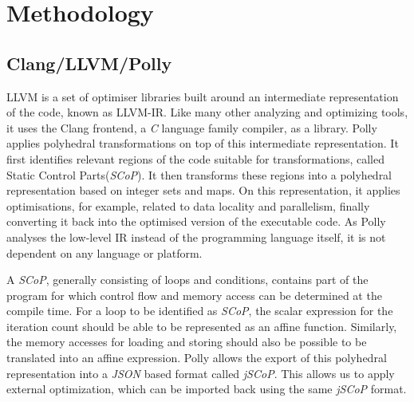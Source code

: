 \documentclass[logo,msc]{infthesis}           %
\begin{document}
\chapter{Methodology}

\section{Clang/LLVM/Polly}

LLVM is a set of optimiser libraries built around an intermediate representation of the code, known as LLVM-IR. Like many other analyzing and optimizing tools, it uses the Clang frontend, a \textit{C} language family compiler, as a library.
Polly applies polyhedral transformations on top of this intermediate representation. It first identifies relevant regions of the code suitable for transformations, called Static Control Parts(\textit{SCoP}). It then transforms these regions into a polyhedral representation based on integer sets and maps. On this representation, it applies optimisations, for example, related to data locality and parallelism, finally converting it back into the optimised version of the executable code. As Polly analyses the low-level IR instead of the programming language itself, it is not dependent on any language or platform.

A \textit{SCoP}, generally consisting of loops and conditions, contains part of the program for which control flow and memory access can be determined at the compile time. For a loop to be identified as \textit{SCoP}, the scalar expression for the iteration count should be able to be represented as an affine function. Similarly, the memory accesses for loading and storing should also be possible to be translated into an affine expression. Polly allows the export of this polyhedral representation into a \textit{JSON} based format called \textit{jSCoP}.
This allows us to apply external optimization, which can be imported back using the same \textit{jSCoP} format.
\end{document}
